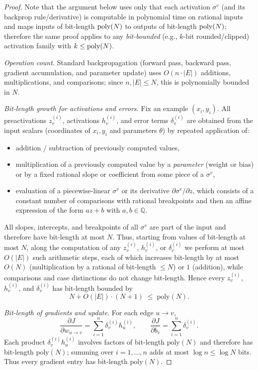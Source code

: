 \documentclass{article}
\newcommand{\poly}{\textnormal{poly}}
\theoremstyle{plain}
\theoremstyle{definition}
\theoremstyle{remark}
\begin{document}
\begin{proof}
Note that the argument below uses only that each activation $\sigma^v$ (and its backprop rule/derivative)
is computable in polynomial time on rational inputs and maps inputs of bit-length $\poly(N)$ to outputs of
bit-length $\poly(N)$; therefore the same proof applies to any \emph{bit-bounded} (e.g., $k$-bit rounded/clipped)
activation family with $k\le \poly(N)$.


	\emph{Operation count.}
	Standard backpropagation (forward pass, backward pass, gradient accumulation,
	and parameter update) uses $O(n\cdot|E|)$ additions, multiplications, and
	comparisons; since $n,|E|\le N$, this is polynomially bounded in $N$.
	
	\emph{Bit-length growth for activations and errors.}
	Fix an example $(x_i,y_i)$. All preactivations $z_v^{(i)}$, activations
	$h_v^{(i)}$, and error terms $\delta_v^{(i)}$ are obtained from the input
	scalars (coordinates of $x_i,y_i$ and parameters $\theta$) by repeated
	application of:
	\begin{itemize}
		\item addition / subtraction of previously computed values,
		\item multiplication of a previously computed value by a \emph{parameter}
		(weight or bias) or by a fixed rational slope or coefficient from some
		piece of a $\sigma^v$,
		\item evaluation of a piecewise-linear $\sigma^v$ or its derivative
		$\partial\sigma^v/\partial z$, which consists of a constant number of
		comparisons with rational breakpoints and then an affine expression of the
		form $a z + b$ with $a,b\in\mathbb{Q}$.
	\end{itemize}
	All slopes, intercepts, and breakpoints of all $\sigma^v$ are part of the
	input and therefore have bit-length at most $N$. Thus, starting from values
	of bit-length at most $N$, along the computation of any $z_v^{(i)}$,
	$h_v^{(i)}$, or $\delta_v^{(i)}$ we perform at most $O(|E|)$ such arithmetic
	steps, each of which increases bit-length by at most $O(N)$ (multiplication
	by a rational of bit-length $\le N$) or $1$ (addition), while comparisons and
	case distinctions do not change bit-length. Hence every $z_v^{(i)}$,
	$h_v^{(i)}$, and $\delta_v^{(i)}$ has bit-length bounded by
	\[
	N + O(|E|)\cdot(N+1) \;\le\; \mathrm{poly}(N).
	\]
	
	\emph{Bit-length of gradients and update.}
	For each edge $u\to v$,
	\[
	\frac{\partial J}{\partial w_{u\to v}}
	= \sum_{i=1}^n \delta_v^{(i)} h_u^{(i)},
	\qquad
	\frac{\partial J}{\partial b_v}
	= \sum_{i=1}^n \delta_v^{(i)}.
	\]
	Each product $\delta_v^{(i)} h_u^{(i)}$ involves factors of bit-length
	$\mathrm{poly}(N)$ and therefore has bit-length $\mathrm{poly}(N)$; summing
	over $i=1,\dots,n$ adds at most $\log n \le \log N$ bits. Thus every gradient
	entry has bit-length $\mathrm{poly}(N)$.
	

\end{proof}
\end{document}
